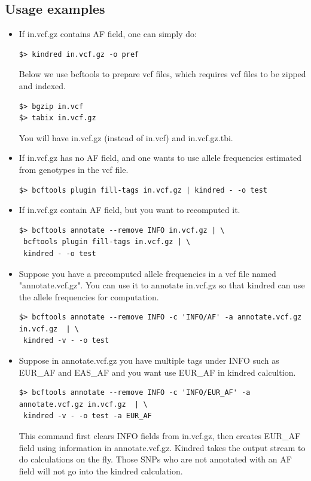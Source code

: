 \documentclass[11pt,Times]{article}
\begin{document}
\subsection{Usage examples}

\begin{itemize}
\item If in.vcf.gz contains AF field, one can simply do: 
\begin{verbatim}
$> kindred in.vcf.gz -o pref
\end{verbatim}

Below we use bcftools to prepare vcf files, which requires vcf files to be zipped and indexed. 
\begin{verbatim}
$> bgzip in.vcf 
$> tabix in.vcf.gz
\end{verbatim}
You will have in.vcf.gz (instead of in.vcf) and in.vcf.gz.tbi. 


\item If in.vcf.gz has no AF field, and one wants to use allele frequencies estimated from genotypes in the vcf file. 
\begin{verbatim}
$> bcftools plugin fill-tags in.vcf.gz | kindred - -o test
\end{verbatim}

\item If in.vcf.gz contain AF field, but you want to recomputed it. 
\begin{verbatim}
$> bcftools annotate --remove INFO in.vcf.gz | \
 bcftools plugin fill-tags in.vcf.gz | \
 kindred - -o test
\end{verbatim}

\item Suppose you have a precomputed allele frequencies in a vcf file named "annotate.vcf.gz". You can use it to annotate in.vcf.gz so that kindred can use the allele frequencies for computation. 
\begin{verbatim}
$> bcftools annotate --remove INFO -c 'INFO/AF' -a annotate.vcf.gz in.vcf.gz  | \
 kindred -v - -o test
\end{verbatim}

\item Suppose in annotate.vcf.gz you have multiple tags under INFO such as EUR\_AF and EAS\_AF and you want use EUR\_AF in kindred calcultion. 
\begin{verbatim}
$> bcftools annotate --remove INFO -c 'INFO/EUR_AF' -a annotate.vcf.gz in.vcf.gz  | \
 kindred -v - -o test -a EUR_AF
\end{verbatim}
This command first clears INFO fields from in.vcf.gz, then creates EUR\_AF field using information in annotate.vcf.gz.  Kindred takes the output stream to do calculations on the fly.  Those SNPs who are not annotated with an AF field will not go into the kindred calculation. 
%


\end{itemize}
\end{document}
